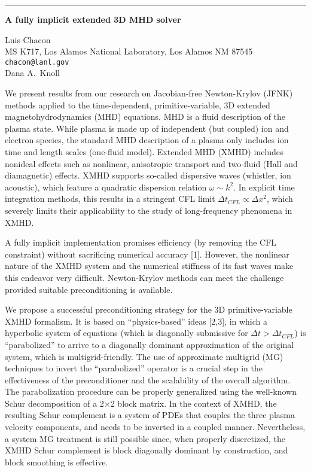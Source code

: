 \documentclass[twosided]{report}
\begin{document}
	\begin{center} \rule{6in}{1pt} \end{center}

\begin{center}
{\large			%
{\bf A fully implicit extended 3D MHD solver}}

	Luis Chacon \\
	MS K717, Los Alamos National Laboratory, Los Alamos NM 87545 \\
	{\tt chacon@lanl.gov} \\
	Dana A.~Knoll
\end{center}
We present results from our research on Jacobian-free
Newton-Krylov (JFNK) methods applied to the time-dependent,
primitive-variable, 3D extended magnetohydrodynamics (MHD)
equations. MHD is a fluid description of the plasma state.
While plasma is made up of independent (but coupled) ion and
electron species, the standard MHD description of a plasma
only includes ion time and length scales (one-fluid model).
Extended MHD (XMHD) includes nonideal effects such as
nonlinear, anisotropic transport and two-fluid (Hall and
diamagnetic) effects. XMHD supports so-called dispersive
waves (whistler, ion acoustic), which feature a quadratic
dispersion relation $\omega \sim k^{2}$. In explicit time
integration methods, this results in a stringent CFL limit
$\Delta t_{CFL}\propto \Delta x^{2}$, which severely limits
their applicability to the study of long-frequency phenomena
in XMHD.

A fully implicit implementation promises
efficiency (by removing the CFL constraint) without
sacrificing numerical accuracy [1].
However, the nonlinear
nature of the XMHD system and the numerical stiffness of its
fast waves make this endeavor very difficult. Newton-Krylov
methods can meet the challenge provided suitable
preconditioning is available.

We propose a successful
preconditioning strategy for the 3D primitive-variable XMHD
formalism. It is based on ``physics-based'' ideas [2,3],
in which a hyperbolic system of
equations (which is diagonally submissive for $\Delta
t>\Delta t_{CFL}$) is {}``parabolized'' to arrive to a
diagonally dominant approximation of the original system,
which is multigrid-friendly. The use of approximate
multigrid (MG) techniques to invert the {}``parabolized''
operator is a crucial step in the effectiveness of the
preconditioner and the scalability of the overall algorithm.
The parabolization procedure can be properly generalized
using the well-known Schur decomposition of a 2$\times $2
block matrix. In the context of XMHD, the resulting Schur
complement is a system of PDEs that couples the three
plasma velocity components, and needs to be inverted in a
coupled manner. Nevertheless, a system MG treatment is still
possible since, when properly discretized, the XMHD Schur
complement is block diagonally dominant by construction, and
block smoothing is effective.
\end{document}
